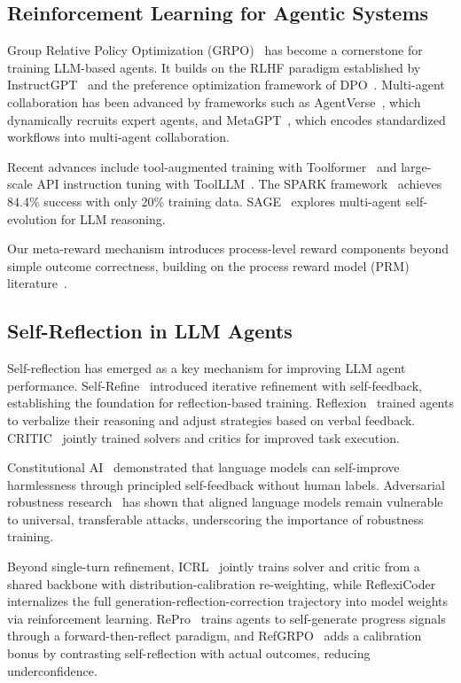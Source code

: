 \documentclass[notspecified,article,accept,pdftex,moreauthors]{Definitions/mdpi}
\begin{document}
\subsection{Reinforcement Learning for Agentic Systems}
Group Relative Policy Optimization (GRPO)~\cite{b15} has become a cornerstone for training LLM-based agents. It builds on the RLHF paradigm established by InstructGPT~\cite{b16} and the preference optimization framework of DPO~\cite{b17}. Multi-agent collaboration has been advanced by frameworks such as AgentVerse~\cite{b18}, which dynamically recruits expert agents, and MetaGPT~\cite{b19}, which encodes standardized workflows into multi-agent collaboration.

Recent advances include tool-augmented training with Toolformer~\cite{b20} and large-scale API instruction tuning with ToolLLM~\cite{b21}. The SPARK framework~\cite{b22} achieves 84.4\% success with only 20\% training data. SAGE~\cite{b48} explores multi-agent self-evolution for LLM reasoning.

Our meta-reward mechanism introduces process-level reward components beyond simple outcome correctness, building on the process reward model (PRM) literature~\cite{b32}.

\subsection{Self-Reflection in LLM Agents}
Self-reflection has emerged as a key mechanism for improving LLM agent performance. Self-Refine~\cite{b50} introduced iterative refinement with self-feedback, establishing the foundation for reflection-based training. Reflexion~\cite{b51} trained agents to verbalize their reasoning and adjust strategies based on verbal feedback. CRITIC~\cite{b52} jointly trained solvers and critics for improved task execution.

Constitutional AI~\cite{b26} demonstrated that language models can self-improve harmlessness through principled self-feedback without human labels. Adversarial robustness research~\cite{b27} has shown that aligned language models remain vulnerable to universal, transferable attacks, underscoring the importance of robustness training.

Beyond single-turn refinement, ICRL~\cite{b28} jointly trains solver and critic from a shared backbone with distribution-calibration re-weighting, while ReflexiCoder~\cite{b29} internalizes the full generation-reflection-correction trajectory into model weights via reinforcement learning. RePro~\cite{b30} trains agents to self-generate progress signals through a forward-then-reflect paradigm, and RefGRPO~\cite{b31} adds a calibration bonus by contrasting self-reflection with actual outcomes, reducing underconfidence.
\end{document}
